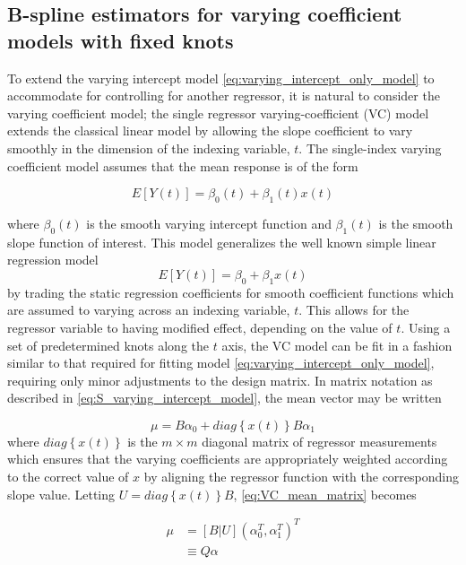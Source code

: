 \documentclass[12pt]{article}
\begin{document}
\subsection{B-spline estimators for varying coefficient models with fixed knots}

To extend the varying intercept model \ref{eq:varying_intercept_only_model} to accommodate for controlling for another regressor, it is natural to consider the varying coefficient model; the single regressor varying-coefficient (VC) model extends the classical linear model by allowing the slope coefficient to vary smoothly in the dimension of the indexing variable, $t$.  The single-index varying coefficient model assumes that the mean response is of the form

\begin{equation} \label{eq:simplest_VC_model_mean}
E\left[ Y\left(t\right) \right] = \beta_0\left(t\right) + \beta_1\left(t\right)x\left(t\right)
\end{equation}

where $\beta_0\left(t\right)$ is the smooth varying intercept function and $\beta_1\left(t\right)$ is the smooth slope function of interest. This model generalizes the well known simple linear regression model 
\[
E\left[Y\left(t\right)\right] = \beta_0 + \beta_1 x\left(t\right)
\]
by trading the static regression coefficients for smooth coefficient functions which are assumed to varying across an indexing variable, $t$. This allows for the regressor variable to having modified effect, depending on the value of $t$. Using a set of predetermined knots along the $t$ axis, the VC model can be fit in a fashion similar to that required for fitting model \ref{eq:varying_intercept_only_model}, requiring only minor adjustments to the design matrix. In matrix notation as described in \ref{eq:S_varying_intercept_model}, the mean vector may be written

\begin{equation} \label{eq:VC_mean_matrix}
\mu = B\alpha_0 + diag\left\{x\left(t\right) \right\}B\alpha_1
\end{equation} 
\noindent
where $diag\left\{x\left(t\right) \right\}$ is the $m \times m$ diagonal matrix of regressor measurements which ensures that the varying coefficients are appropriately weighted according to the correct value of $x$ by aligning the regressor function with the corresponding slope value. Letting $U = diag\left\{x\left(t\right) \right\}B$, \ref{eq:VC_mean_matrix} becomes

\begin{align}
\mu &= \left[ B | U \right] \left(\alpha_0^T,\alpha_1^T\right)^T \\
&\equiv Q\alpha
\end{align} 
\end{document}
